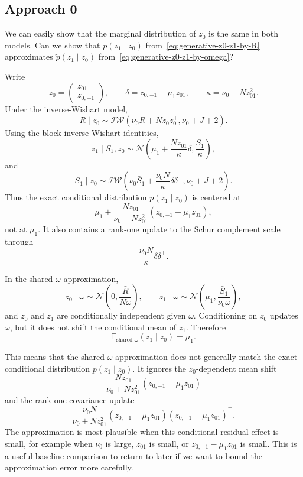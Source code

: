 \documentclass[11pt]{article}
\newcommand{\Rbar}{\bar R}
\newcommand{\E}{\mathbb E}
\newcommand{\Normal}{\mathcal N}
\begin{document}
\subsection*{Approach 0}

We can easily show that the marginal distribution of $z_0$ is the same in both models. Can we show that $p(z_1 \mid z_0)$ from~\eqref{eq:generative-z0-z1-by-R} approximates $\tilde{p}(z_1 \mid z_0)$ from~\eqref{eq:generative-z0-z1-by-omega}?

Write
\[
z_0=
\begin{pmatrix}
z_{01}\\ z_{0,-1}
\end{pmatrix},
\qquad
\delta=z_{0,-1}-\mu_1z_{01},
\qquad
\kappa=\nu_0+Nz_{01}^2.
\]
Under the inverse-Wishart model,
\[
R\mid z_0
\sim
\mathcal{IW}\left(
\nu_0\Rbar+Nz_0z_0^\top,\nu_0+J+2
\right).
\]
Using the block inverse-Wishart identities,
\[
z_1\mid S_1,z_0
\sim
\Normal\left(
\mu_1+\frac{Nz_{01}}{\kappa}\delta,
\frac{S_1}{\kappa}
\right),
\]
and
\[
S_1\mid z_0
\sim
\mathcal{IW}\left(
\nu_0\bar S_1+
\frac{\nu_0 N}{\kappa}\delta\delta^\top,
\nu_0+J+2
\right).
\]
Thus the exact conditional distribution \(p(z_1\mid z_0)\) is centered at
\[
\mu_1+\frac{Nz_{01}}{\nu_0+Nz_{01}^2}
(z_{0,-1}-\mu_1z_{01}),
\]
not at \(\mu_1\). It also contains a rank-one update to the Schur complement
scale through
\[
\frac{\nu_0 N}{\kappa}\delta\delta^\top.
\]

In the shared-\(\omega\) approximation,
\[
z_0\mid\omega
\sim
\Normal\left(0,\frac{\bar R}{N\omega}\right),
\qquad
z_1\mid\omega
\sim
\Normal\left(\mu_1,\frac{\bar S_1}{\nu_0\omega}\right),
\]
and \(z_0\) and \(z_1\) are conditionally independent given \(\omega\).
Conditioning on \(z_0\) updates \(\omega\), but it does not shift the
conditional mean of \(z_1\). Therefore
\[
\E_{\mathrm{shared}\text{-}\omega}(z_1\mid z_0)=\mu_1.
\]

This means that the shared-\(\omega\) approximation does not generally match
the exact conditional distribution \(p(z_1\mid z_0)\). It ignores the
\(z_0\)-dependent mean shift
\[
\frac{Nz_{01}}{\nu_0+Nz_{01}^2}
(z_{0,-1}-\mu_1z_{01})
\]
and the rank-one covariance update
\[
\frac{\nu_0 N}{\nu_0+Nz_{01}^2}
(z_{0,-1}-\mu_1z_{01})(z_{0,-1}-\mu_1z_{01})^\top.
\]
The approximation is most plausible when this conditional residual effect is
small, for example when \(\nu_0\) is large, \(z_{01}\) is small, or
\(z_{0,-1}-\mu_1z_{01}\) is small. This is a useful baseline comparison to
return to later if we want to bound the approximation error more carefully.
\end{document}
